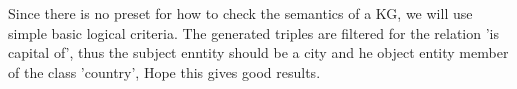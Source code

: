 Since there is no preset for how to check the semantics of a KG, we will use simple basic logical criteria.
The generated triples are filtered for the relation 'is capital of', thus the subject enntity should be a city and he object entity member of the class 'country',
Hope this gives good results.
